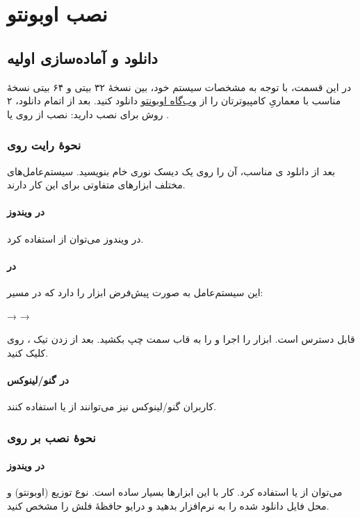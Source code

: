 \chapter{نصب اوبونتو}
\section{دانلود و آماده‌سازی اولیه}
در این قسمت، با توجه به مشخصات سیستم خود، بین نسخهٔ ۳۲ بیتی و ۶۴ بیتی نسخهٔ مناسب با معماریِ کامپیوترتان را از \href{http://www.ubuntu.com/download/desktop}{وب‌گاه اوبونتو} دانلود کنید. بعد از اتمام دانلود، ۲ روش برای نصب دارید: نصب از روی 
 یا .

\subsection[نحوهٔ رایت روی DVD]{نحوهٔ رایت روی }
بعد از دانلود  ی مناسب، آن را روی یک دیسک نوری خام بنویسید. 
سیستم‌عامل‌های مختلف ابزارهای متفاوتی برای این کار دارند.

\subsubsection{در ویندوز}
در ویندوز می‌توان از \href{http://infrarecorder.org/}{} 
استفاده کرد.

\subsubsection{در }
این سیستم‌عامل به صورت پیش‌فرض ابزار  را دارد که در مسیر:
\begin{center}
 \textsf{→}  \textsf{→} \\
\end{center}
قابل دسترس است. ابزار  را اجرا و  را به قاب سمت چپ 
بکشید. بعد از زدن تیک ، روی  کلیک کنید.

\subsubsection{در گنو/لینوکس}
کاربران گنو/لینوکس نیز می‌توانند از  یا  استفاده کنند.

\subsection[نحوهٔ نصب بر روی USB]{نحوهٔ نصب بر روی }
\subsubsection{در ویندوز}
می‌توان از \href{http://www.pendrivelinux.com/}{} یا 
\href{http://www.linuxliveusb.com/}{} استفاده کرد. کار با این ابزارها 
بسیار ساده است. نوع توزیع (اوبونتو) و محل فایل  دانلود شده را به 
نرم‌افزار بدهید و درایو حافظهٔ فلش را مشخص کنید.

